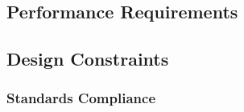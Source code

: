 \documentclass[compsoc,draftclsnofoot,onecolumn,10pt]{IEEEtran}
\begin{document}
\subsection{Performance Requirements}
%
%
%
%
%
%
%
%
%

\subsection{Design Constraints}

\subsubsection{Standards Compliance}
%
%
\end{document}
